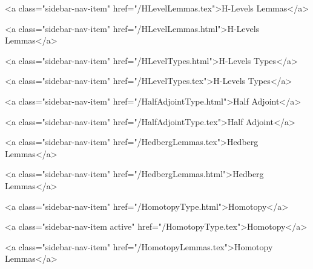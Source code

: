       
        
          <a class="sidebar-nav-item" href="/HLevelLemmas.tex">H-Levels Lemmas</a>
        
      
    
      
        
          <a class="sidebar-nav-item" href="/HLevelLemmas.html">H-Levels Lemmas</a>
        
      
    
      
        
          <a class="sidebar-nav-item" href="/HLevelTypes.html">H-Levels Types</a>
        
      
    
      
        
          <a class="sidebar-nav-item" href="/HLevelTypes.tex">H-Levels Types</a>
        
      
    
      
        
          <a class="sidebar-nav-item" href="/HalfAdjointType.html">Half Adjoint</a>
        
      
    
      
        
          <a class="sidebar-nav-item" href="/HalfAdjointType.tex">Half Adjoint</a>
        
      
    
      
        
          <a class="sidebar-nav-item" href="/HedbergLemmas.tex">Hedberg Lemmas</a>
        
      
    
      
        
          <a class="sidebar-nav-item" href="/HedbergLemmas.html">Hedberg Lemmas</a>
        
      
    
      
        
          <a class="sidebar-nav-item" href="/HomotopyType.html">Homotopy</a>
        
      
    
      
        
          <a class="sidebar-nav-item active" href="/HomotopyType.tex">Homotopy</a>
        
      
    
      
        
          <a class="sidebar-nav-item" href="/HomotopyLemmas.tex">Homotopy Lemmas</a>
        
      
    
